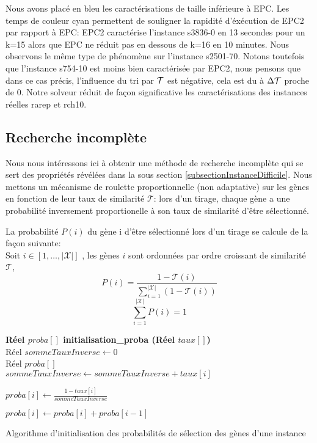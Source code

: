 Nous avons placé en bleu les caractérisations de taille inférieure à EPC. Les temps de couleur cyan permettent de souligner la rapidité d'éxécution de EPC2 par rapport à EPC:  EPC2 caractérise l'instance s3836-0 en 13 secondes pour un k=15 alors que EPC ne réduit pas en dessous de k=16 en 10 minutes. Nous observons le même type de phénomène sur l'instance s2501-70. Notons toutefois que l'instance s754-10 est moins bien caractérisée par EPC2, nous pensons que dans ce cas précis, l'influence du tri par $\cal{T}$ est négative, cela est du à $\Delta\cal{T}$ proche de 0. Notre solveur réduit de façon significative les caractérisations des instances réelles rarep et rch10. 


\subsection{Recherche incomplète}

Nous nous intéressons ici à obtenir une méthode de recherche incomplète qui se sert des propriétés révélées dans la sous section \ref{subsectionInstanceDifficile}. Nous mettons un mécanisme de roulette proportionnelle (non adaptative) sur les gènes en fonction de leur taux de similarité $\mathcal{T}$: lors d'un tirage, chaque gène a une probabilité inversement proportionelle à son taux de similarité d'être sélectionné.

\begin{definition}{}
\label{defProbaGene}
La probabilité $P(i)$ du gène i d'être sélectionné lors d'un tirage se calcule de la façon suivante:\\
Soit $i \in [1,\ldots,|\mathcal{X}|]$ , les gènes $i$ sont ordonnées par ordre croissant de similarité $\mathcal{T}$,
$$ P(i)=\frac{1-\mathcal{T}(i)}{\sum_{i=1}^{|\mathcal{X}|} (1-\mathcal{T}(i))} $$
$$ \sum_{i=1}^{|\mathcal{X}|} P(i) = 1$$
\end{definition}

\begin{algorithm}
	\textbf{Réel $proba[]$ initialisation\_proba (Réel $taux[]$)}\\
	Réel $sommeTauxInverse \leftarrow 0$\\
	Réel $proba[]$\\
	
	
	\PourTous {$i \in [1,\ldots,|\mathcal{X}|$ \tcp{Boucle 1}} 
	{
		$sommeTauxInverse \leftarrow sommeTauxInverse + taux[i]$
	}	
	
	\PourTous {$i \in [1,\ldots,|\mathcal{X}|$ \tcp{Boucle 2}} 
	{
		$proba[i] \leftarrow \frac{1-taux[i]}{sommeTauxInverse}$
	}
	
	\PourTous {$i \in [2,\ldots,|\mathcal{X}|$ \tcp{Boucle 3}} 
	{
		$proba[i] \leftarrow proba[i]+proba[i-1]$
	}
	\caption{Algorithme d'initialisation des probabilités de sélection des gènes d'une instance}
	\label{algoInitialiseProba}
\end{algorithm}

